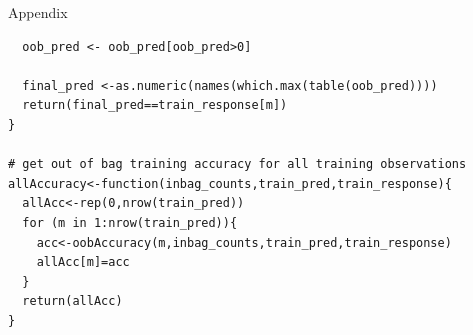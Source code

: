 \documentclass[12pt]{pom_thesis}
\begin{document}
\begin{chapter}{Appendix}
\begin{verbatim}
  oob_pred <- oob_pred[oob_pred>0]
  
  final_pred <-as.numeric(names(which.max(table(oob_pred))))
  return(final_pred==train_response[m])
}

# get out of bag training accuracy for all training observations
allAccuracy<-function(inbag_counts,train_pred,train_response){
  allAcc<-rep(0,nrow(train_pred))
  for (m in 1:nrow(train_pred)){
    acc<-oobAccuracy(m,inbag_counts,train_pred,train_response)
    allAcc[m]=acc
  }
  return(allAcc)
}


\end{verbatim}
\end{chapter}



\end{document}
